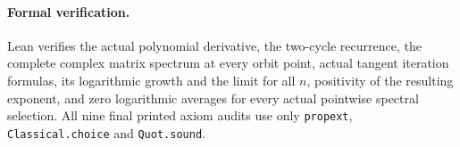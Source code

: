 \documentclass[11pt]{article}
\begin{document}
\paragraph{Formal verification.}
Lean verifies the actual polynomial derivative, the two-cycle recurrence, the complete complex matrix spectrum at every orbit point, actual tangent iteration formulas, its logarithmic growth and the limit for all $n$, positivity of the resulting exponent, and zero logarithmic averages for every actual pointwise spectral selection. All nine final printed axiom audits use only \texttt{propext}, \texttt{Classical.choice} and \texttt{Quot.sound}.
\end{document}
